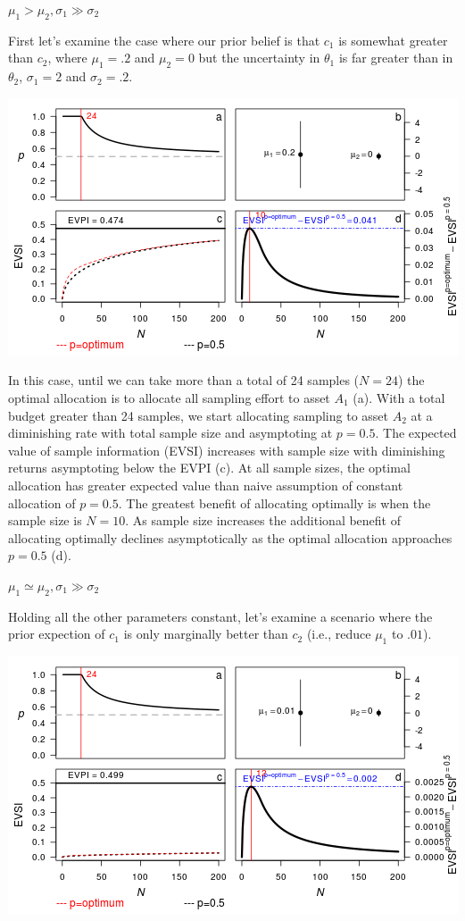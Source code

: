 \documentclass[]{article}
\theoremstyle{definition}
\theoremstyle{definition}
\theoremstyle{remark}
\begin{document}
\textbf{\(\mu_1 > \mu_2, \sigma_1 \gg \sigma_2\)}

First let's examine the case where our prior belief is that \(c_1\) is
somewhat greater than \(c_2\), where \(\mu_1=.2\) and \(\mu_2 = 0\) but
the uncertainty in \(\theta_1\) is far greater than in \(\theta_2\),
\(\sigma_1 = 2\) and \(\sigma_2 = .2\).

\includegraphics{figure/unnamed-chunk-2-1.png} \clearpage

In this case, until we can take more than a total of 24 samples
(\(N=24\)) the optimal allocation is to allocate all sampling effort to
asset \(A_1\) (a). With a total budget greater than 24 samples, we start
allocating sampling to asset \(A_2\) at a diminishing rate with total
sample size and asymptoting at \(p=0.5\). The expected value of sample
information (EVSI) increases with sample size with diminishing returns
asymptoting below the EVPI (c). At all sample sizes, the optimal
allocation has greater expected value than naive assumption of constant
allocation of \(p=0.5\). The greatest benefit of allocating optimally is
when the sample size is \(N=10\). As sample size increases the
additional benefit of allocating optimally declines asymptotically as
the optimal allocation approaches \(p=0.5\) (d).

\textbf{\(\mu_1 \simeq \mu_2, \sigma_1 \gg \sigma_2\)}

Holding all the other parameters constant, let's examine a scenario
where the prior expection of \(c_1\) is only marginally better than
\(c_2\) (i.e., reduce \(\mu_1\) to \(.01\)).

\includegraphics{figure/unnamed-chunk-3-1.png} \clearpage
\end{document}
